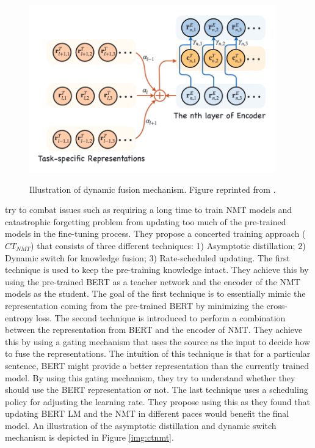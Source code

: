 \begin{figure}[h]
    {\includegraphics[width=0.95\textwidth]{img/dynamic_fusion.png}}
    \centering
    \caption{Illustration of dynamic fusion mechanism. Figure reprinted from \cite{weng2020acquiring}.}
    \label{img:dyn_fn}
\end{figure}

\cite{yang2020towards} try to combat issues such as requiring a long time to train NMT models and catastrophic forgetting problem from updating too much of the pre-trained models in the fine-tuning process. They propose a concerted training approach ($CT_{NMT}$) that consists of three different techniques: 1) Asymptotic distillation; 2) Dynamic switch for knowledge fusion; 3) Rate-scheduled updating. The first technique is used to keep the pre-training knowledge intact. They achieve this by using the pre-trained BERT as a teacher network and the encoder of the NMT models as the student. The goal of the first technique is to essentially mimic the representation coming from the pre-trained BERT by minimizing the cross-entropy loss. The second technique is introduced to perform a combination between the representation from BERT and the encoder of NMT. They achieve this by using a gating mechanism that uses the source as the input to decide how to fuse the representations. The intuition of this technique is that for a particular sentence, BERT might provide a better representation than the currently trained model. By using this gating mechanism, they try to understand whether they should use the BERT representation or not. The last technique uses a scheduling policy for adjusting the learning rate. They propose using this as they found that updating BERT LM and the NMT in different paces would benefit the final model. An illustration of the asymptotic distillation and dynamic switch mechanism is depicted in Figure \ref{img:ctnmt}.

